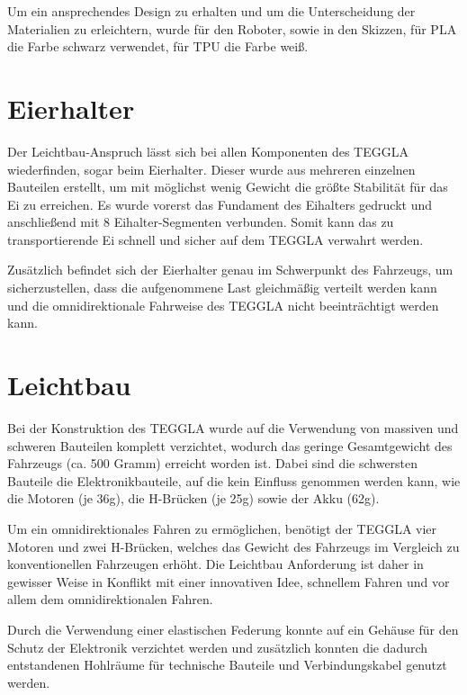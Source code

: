 Um ein ansprechendes Design zu erhalten und um die Unterscheidung der Materialien zu erleichtern, wurde für den Roboter, sowie in den Skizzen, für PLA die Farbe schwarz verwendet, für TPU die Farbe weiß.


\section{Eierhalter}					
Der Leichtbau-Anspruch lässt sich bei allen Komponenten des TEGGLA wiederfinden, sogar beim Eierhalter. 
Dieser wurde aus mehreren einzelnen Bauteilen erstellt, um mit möglichst wenig Gewicht die größte Stabilität für das Ei zu erreichen. 
Es wurde vorerst das Fundament des Eihalters gedruckt und anschließend mit 8 Eihalter-Segmenten verbunden. 
Somit kann das zu transportierende Ei schnell und sicher auf dem TEGGLA verwahrt werden. 

Zusätzlich befindet sich der Eierhalter genau im Schwerpunkt des Fahrzeugs, um sicherzustellen, dass die aufgenommene Last gleichmäßig verteilt werden kann und die omnidirektionale Fahrweise des TEGGLA nicht beeinträchtigt werden kann.



\section{Leichtbau}	

Bei der Konstruktion des TEGGLA wurde auf die Verwendung von massiven und schweren Bauteilen komplett verzichtet, wodurch das geringe Gesamtgewicht des Fahrzeugs (ca. 500 Gramm) erreicht worden ist. 
Dabei sind die schwersten Bauteile die Elektronikbauteile, auf die kein Einfluss genommen werden kann, wie die Motoren (je 36g), die H-Brücken (je 25g) sowie der Akku (62g). 

Um ein omnidirektionales Fahren zu ermöglichen, benötigt der TEGGLA vier Motoren und zwei H-Brücken, welches das Gewicht des Fahrzeugs im Vergleich zu konventionellen Fahrzeugen erhöht. 
Die Leichtbau Anforderung ist daher in gewisser Weise in Konflikt mit einer innovativen Idee, schnellem Fahren und vor allem dem omnidirektionalen Fahren. 

Durch die Verwendung einer elastischen Federung konnte auf ein Gehäuse für den Schutz der Elektronik verzichtet werden und zusätzlich konnten die dadurch entstandenen Hohlräume für technische Bauteile und Verbindungskabel genutzt werden.    
